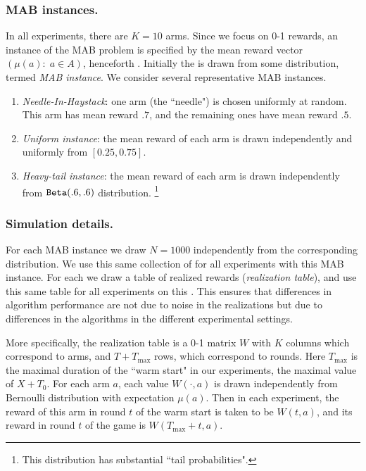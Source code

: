 \documentclass[../competing_bandits.tex]{subfiles}
\begin{document}

\subsubsection{MAB instances.} 
In all experiments, there are $K=10$ arms. Since we focus on 0-1 rewards, an instance of the MAB problem is specified by the mean reward vector $(\mu(a):\; a\in A)$, henceforth \MRV. Initially the \MRV is drawn from some distribution, termed \emph{MAB instance}. We consider several representative MAB instances.
\begin{enumerate}
\item \emph{Needle-In-Haystack}: one arm (the ``needle") is chosen uniformly at random. This arm has mean reward $.7$, and the remaining ones have mean reward $.5$.

\item \emph{Uniform instance}: the mean reward of each arm is drawn independently and uniformly from $[0.25, 0.75]$.
\item \emph{Heavy-tail instance}: the mean reward of each arm is drawn independently from $\mathtt{Beta}(.6,.6)$ distribution.%
    \footnote{This distribution has substantial ``tail probabilities".}
\end{enumerate}

\subsubsection{Simulation details.} 
For each MAB instance we draw $N = 1000$ \MRVs independently from the corresponding distribution. We use this same collection of \MRVs for all experiments with this MAB instance. For each \MRV we draw a table of realized rewards (\emph{realization table}), and use this same table for all experiments on this \MRV. This ensures that differences in algorithm performance are not due to noise in the realizations but due to differences in the algorithms in the different experimental settings. 

More specifically, the realization table is a 0-1 matrix $W$ with $K$ columns which correspond to arms, and $T+T_{\max}$ rows, which correspond to rounds. Here $T_{\max}$ is the maximal duration of the ``warm start" in our experiments, \ie the maximal value of $X+T_0$. For each arm $a$, each value $W(\cdot,a)$ is drawn independently from Bernoulli distribution with expectation $\mu(a)$. Then in each experiment, the reward of this arm in round $t$ of the warm start is taken to be $W(t,a)$, and its reward in round $t$ of the game is $W(T_{\max}+t,a)$.
\end{document}
